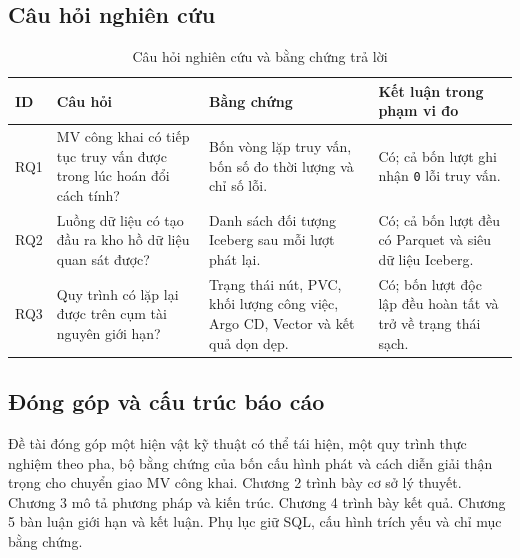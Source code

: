 \subsection{Câu hỏi nghiên cứu}
\begin{table}[t!]
\centering
\caption{Câu hỏi nghiên cứu và bằng chứng trả lời}
\label{tab:rqs-vi}
\begin{tabularx}{\textwidth}{@{}p{}Y Y Y@{}}
\toprule
\textbf{ID} & \textbf{Câu hỏi} & \textbf{Bằng chứng} & \textbf{Kết luận trong phạm vi đo}\\
\midrule
RQ1 & MV công khai có tiếp tục truy vấn được trong lúc hoán đổi cách tính? & Bốn vòng lặp truy vấn, bốn số đo thời lượng và chỉ số lỗi. & Có; cả bốn lượt ghi nhận \texttt{0} lỗi truy vấn.\\
RQ2 & Luồng dữ liệu có tạo đầu ra kho hồ dữ liệu quan sát được? & Danh sách đối tượng Iceberg sau mỗi lượt phát lại. & Có; cả bốn lượt đều có Parquet và siêu dữ liệu Iceberg.\\
RQ3 & Quy trình có lặp lại được trên cụm tài nguyên giới hạn? & Trạng thái nút, PVC, khối lượng công việc, Argo CD, Vector và kết quả dọn dẹp. & Có; bốn lượt độc lập đều hoàn tất và trở về trạng thái sạch.\\
\bottomrule
\end{tabularx}
\end{table}

\subsection{Đóng góp và cấu trúc báo cáo}
Đề tài đóng góp một hiện vật kỹ thuật có thể tái hiện, một quy trình thực nghiệm theo pha, bộ bằng chứng của bốn cấu hình phát và cách diễn giải thận trọng cho chuyển giao MV công khai. Chương 2 trình bày cơ sở lý thuyết. Chương 3 mô tả phương pháp và kiến trúc. Chương 4 trình bày kết quả. Chương 5 bàn luận giới hạn và kết luận. Phụ lục giữ SQL, cấu hình trích yếu và chỉ mục bằng chứng.
